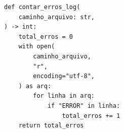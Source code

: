 \ifmostrarGabarito
\begin{verbatim}
def contar_erros_log(
    caminho_arquivo: str,
) -> int:
    total_erros = 0
    with open(
        caminho_arquivo,
        "r",
        encoding="utf-8",
    ) as arq:
        for linha in arq:
            if "ERROR" in linha:
                total_erros += 1
    return total_erros
\end{verbatim}

\fi
